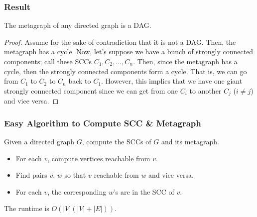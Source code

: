 \documentclass[letterpaper]{article}
\begin{document}
\subsubsection{Result}
\begin{theorem}{}{}
    The metagraph of any directed graph is a DAG. 
\end{theorem}

\begin{mdframed}[]
    \begin{proof}
        Assume for the sake of contradiction that it is not a DAG. Then, the metagraph has a cycle. Now, let's suppose we have a bunch of strongly connected components; call these SCCs $C_1, C_2, \dots, C_n$. Then, since the metagraph has a cycle, then the strongly connected components form a cycle. That is, we can go from $C_1$ to $C_2$ to $C_n$ back to $C_1$. However, this implies that we have one giant strongly connected component since we can get from one $C_i$ to another $C_j$ ($i \neq j$) and vice versa.     
    \end{proof}
\end{mdframed}

\subsubsection{Easy Algorithm to Compute SCC \& Metagraph}
Given a directed graph $G$, compute the SCCs of $G$ and its metagraph. 
\begin{itemize}
    \item For each $v$, compute vertices reachable from $v$.
    \item Find pairs $v$, $w$ so that $v$ reachable from $w$ and vice versa.
    \item For each $v$, the corresponding $w$'s are in the SCC of $v$.
\end{itemize}
The runtime is $O(|V|(|V| + |E|))$.
\end{document}
